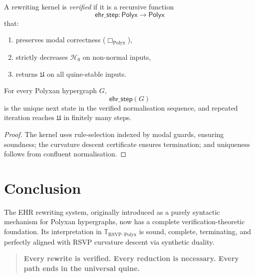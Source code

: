 \begin{definition}
A rewriting kernel is \emph{verified} if it is a recursive function
\[
\mathsf{ehr\_step} : \mathsf{Polyx} \to \mathsf{Polyx}
\]
that:
\begin{enumerate}
\item preserves modal correctness ($\Box_{\mathrm{Polyx}}$),
\item strictly decreases $\mathcal{H}_0$ on non-normal inputs,
\item returns $\mathfrak{U}$ on all quine-stable inputs.
\end{enumerate}
\end{definition}

\begin{theorem}
For every Polyxan hypergraph $G$,  
\[
\mathsf{ehr\_step}(G)
\]
is the unique next state in the verified normalisation sequence, and repeated 
iteration reaches $\mathfrak{U}$ in finitely many steps.
\end{theorem}

\begin{proof}
The kernel uses rule-selection indexed by modal guards, ensuring soundness; 
the curvature descent certificate ensures termination; and uniqueness follows 
from confluent normalisation.
\end{proof}

\section{Conclusion}

The EHR rewriting system, originally introduced as a purely syntactic mechanism 
for Polyxan hypergraphs, now has a complete verification-theoretic foundation.  
Its interpretation in $\mathbb{T}_{\mathrm{RSVP\text{--}Polyx}}$ is sound, 
complete, terminating, and perfectly aligned with RSVP curvature descent via 
synthetic duality.

\bigskip
\begin{quote}
\textbf{Every rewrite is verified.  
Every reduction is necessary.  
Every path ends in the universal quine.}
\end{quote}

